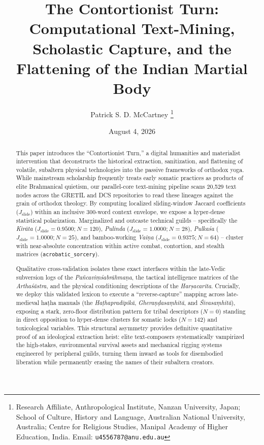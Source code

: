 \documentclass[11pt,twoside,letterpaper]{article}
\title{\textbf{The Contortionist Turn: Computational Text-Mining, Scholastic Capture, and the Flattening of the Indian Martial Body}}
\author{Patrick S. D. McCartney%
\thanks{Research Affiliate, Anthropological Institute, Nanzan University, Japan; %
School of Culture, History and Language, Australian National University, Australia; %
Centre for Religious Studies, Manipal Academy of Higher Education, India. %
Email: \texttt{u4556787@anu.edu.au}}}
\date{August 4, 2026}
\begin{document}
\maketitle
\begin{abstract}

This paper introduces the ``Contortionist Turn,''  a digital humanities and materialist intervention that deconstructs the historical extraction, sanitization, and flattening of volatile, subaltern physical technologies into the passive frameworks of orthodox yoga. While mainstream scholarship frequently treats early somatic practices as products of elite Brahmanical quietism, our parallel-core text-mining pipeline scans 20,529 text nodes across the GRETIL and DCS repositories to read these lineages against the grain of orthodox theology. By computing localized sliding-window Jaccard coefficients ($J_{\text{slide}}$) within an inclusive 300-word context envelope, we expose a hyper-dense statistical polarization. Marginalized and outcaste technical guilds -- specifically the \textit{Kirāta} ($J_{\text{slide}} = 0.9500; N=120$), \textit{Pulinda} ($J_{\text{slide}} = 1.0000; N=28$), \textit{Pulkaśa} ($J_{\text{slide}} = 1.0000; N=25$), and bamboo-working \textit{Vaiṇa} ($J_{\text{slide}} = 0.9375; N=64$) -- cluster with near-absolute concentration within active combat, contortion, and stealth matrices (\texttt{acrobatic\_sorcery}). 

Qualitative cross-validation isolates these exact interfaces within the late-Vedic subversion logs of the \textit{Pañcaviṃśabrāhmaṇa}, the tactical intelligence matrices of the \textit{Arthaśāstra}, and the physical conditioning descriptions of the \textit{Harṣacarita}. Crucially, we deploy this validated lexicon to execute a ``reverse-capture'' mapping across late-medieval haṭha manuals (the \textit{Haṭhapradīpikā}, \textit{Gheraṇḍasaṃhitā}, and \textit{Śivasaṃhitā}), exposing a stark, zero-floor distribution pattern for tribal descriptors ($N=0$) standing in direct opposition to hyper-dense clusters for somatic locks ($N=142$) and toxicological variables. This structural asymmetry provides definitive quantitative proof of an ideological extraction heist: elite text-composers systematically vampirized the high-stakes, environmental survival assets and mechanical rigging systems engineered by peripheral guilds, turning them inward as tools for disembodied liberation while permanently erasing the names of their subaltern creators.
\end{abstract}
\end{document}
